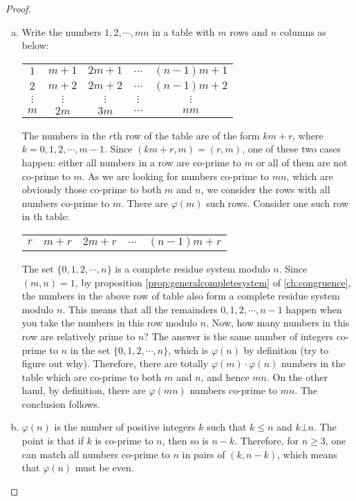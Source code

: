 	\begin{proof}
		$ $
		\begin{enumerate}[(a)]
			\item Write the numbers $1,2,\cdots,mn$ in a table with $m$ rows and $n$ columns as below:
				\begin{center}
					\begin{tabular}{ccccc}
						$1$ & $m+1$ & $2m+1$ & $\ldots$ & $(n-1)m+1$\\
						$2$ & $m+2$ & $2m+2$ & $\ldots$ & $(n-1)m+2$\\
						$\vdots$ & $\vdots$ & $\vdots$ & $\vdots$ & $\vdots$\\
						$m$ & $2m$ & $3m$ & $\ldots$ & $nm$
					\end{tabular}
				\end{center}
			The numbers in the $r$th row of the table are of the form $km+r$, where $k=0,1,2,\cdots,m-1$. Since $(km+r,m)=(r,m)$, one of these two cases happen: either all numbers in a row are co-prime to $m$ or all of them are not co-prime to $m$. As we are looking for numbers co-prime to $mn$, which are obviously those co-prime to both $m$ and $n$, we consider the rows with all numbers co-prime to $m$. There are $\varphi(m)$ such rows. Consider one such row in th table:
				\begin{center}
					\begin{tabular}{ccccc}
						$r$ & $m+r$ & $2m+r$ & $\ldots$ & $(n-1)m+r$
					\end{tabular}
				\end{center}
			The set $\{0, 1, 2, \cdots, n\}$ is a complete residue system modulo $n$. Since $(m,n)=1$, by proposition \ref{prop:generalcompletesystem} of \autoref{ch:congruence}, the numbers in the above row of table also form a complete residue system modulo $n$. This means that all the remainders $0,1,2,\cdots,n-1$ happen when you take the numbers in this row modulo $n$. Now, how many numbers in this row are relatively prime to $n$? The answer is the same number of integers co-prime to $n$ in the set $\{0, 1, 2, \cdots, n\}$, which is $\varphi(n)$ by definition (try to figure out why). Therefore, there are totally $\varphi(m) \cdot \varphi(n)$ numbers in the table which are co-prime to both $m$ and $n$, and hence $mn$. On the other hand, by definition, there are $\varphi(mn)$ numbers co-prime to $mn$. The conclusion follows.

			\item $\varphi(n)$ is the number of positive integers $k$ such that $k \leq n$ and $k \bot n$. The point is that if $k$ is co-prime to $n$, then so is $n-k$. Therefore, for $n\geq 3$, one can match all numbers co-prime to $n$ in pairs of $(k, n-k)$, which means that $\varphi(n)$ must be even.


\end{enumerate}
\end{proof}

